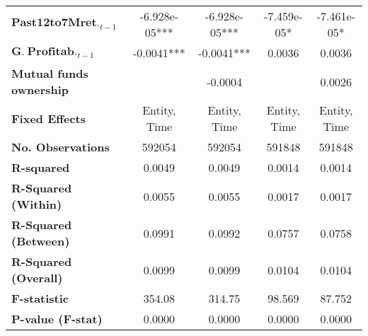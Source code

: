 {\begin{longtable}{>{\bfseries}lcccc}
$\mathbf{Past 12 to 7M ret.}_{t-1}$        &     -6.928e-05***     &            -6.928e-05***           &     -7.459e-05*     &         -7.461e-05*          \\
$\mathbf{G.~Profitab.}_{t-1}$      &      -0.0041***       &             -0.0041***            &       0.0036       &           0.0036            \\
Mutual funds ownership     &                    &             -0.0004             &                    &           0.0026            \\
\midrule
Fixed Effects                           &       Entity, Time       &              Entity, Time             &       Entity, Time       &           Entity, Time            \\
\bottomrule
\toprule
\textbf{No. Observations}                  &       592054       &              592054             &       591848       &           591848            \\
\textbf{R-squared}                         &       0.0049       &              0.0049             &       0.0014       &           0.0014            \\
\textbf{R-Squared (Within)}                &       0.0055       &              0.0055             &       0.0017       &           0.0017            \\
\textbf{R-Squared (Between)}               &       0.0991       &              0.0992             &       0.0757       &           0.0758            \\
\textbf{R-Squared (Overall)}               &       0.0099       &              0.0099             &       0.0104       &           0.0104            \\
\textbf{F-statistic}                       &       354.08       &              314.75             &       98.569       &           87.752            \\
\textbf{P-value (F-stat)}                  &       0.0000       &              0.0000             &       0.0000       &           0.0000            \\
\bottomrule
\end{longtable}
}

